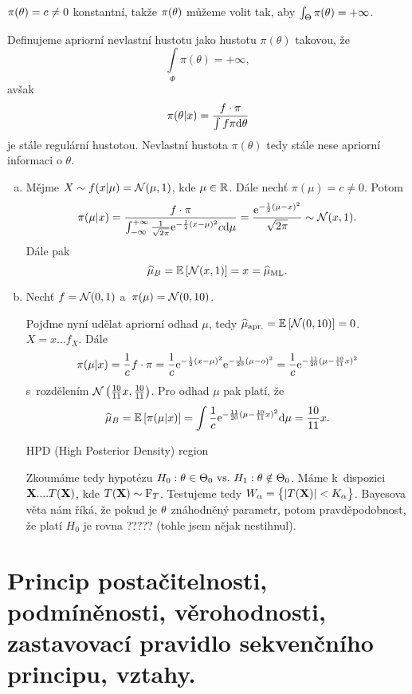 

$\pi(\theta)=c\neq0$ konstantní, takže $\pi(\theta)$ můžeme volit tak, aby $\int_\Theta\pi(\theta)=+\infty$.
\begin{define} Definujeme apriorní nevlastní hustotu jako hustotu $\pi(\theta)$ takovou, že $$ \int\limits_{\Phi}{\pi(\theta)} = +\infty,$$  avšak 
	$$\pi(\theta|x)=\frac{f\cdot \pi}{\int f\pi\mathrm{d}\theta}$$ je stále regulární hustotou. Nevlastní hustota $\pi(\theta)$ tedy stále nese apriorní informaci o $\theta$.
\end{define}
\begin{example}\begin{enumerate}[a)]
		\item 
	Mějme $X\sim f(x|\mu)=\mathcal{N}(\mu,1)$, kde $\mu\in\mathbb{R}$. Dále nechť $\pi(\mu)=c\neq0$. Potom$$ \pi(\mu|x)=\frac{f\cdot \pi}{\int_{-\infty}^{+\infty}\frac{1}{\sqrt{2\pi}}\mathrm{e}^{-\frac{1}{2}(x-\mu)^2}c\mathrm{d}\mu}=\frac{\mathrm{e}^{-\frac{1}{2}(\mu-x)^2}}{\sqrt{2\pi}}\sim\mathcal{N}(x,1).$$
	Dále pak 
	$$\widehat{\mu}_B=\mathbb{E}\left[ \mathcal{N}(x,1) \right]=x=\widehat{\mu}_{\mathrm{ML}}.$$
	\item Nechť $f=\mathcal{N}(0,1)$ a~$\pi(\mu)=\mathcal{N}(0,10)$.
	
	
	
	Pojďme nyní udělat apriorní odhad $\mu$, tedy $\widehat{\mu}_{\mathrm{apr.}}=\mathbb{E}\left[ \mathcal{N}(0,10) \right]=0$. $X=x...f_X$. Dále
	$$ \pi(\mu|x)=\frac{1}{c}f\cdot\pi=\frac{1}{c}\mathrm{e}^{-\frac{1}{2}(x-\mu)^2}\mathrm{e}^{-\frac{1}{20}(\mu-o)^2}=\frac{1}{c}\mathrm{e}^{-\frac{11}{20}(\mu-\frac{10}{11}x)^2}$$ s~rozdělením $\mathcal{N}\left(\frac{10}{11}x,\frac{10}{11}\right)$.
	Pro odhad $\mu$ pak platí, že
	$$\widehat{\mu}_B=\mathbb{E}\left[ \pi(\mu|x) \right]=\int\frac{1}{c}\mathrm{e}^{-\frac{11}{20}(\mu-\frac{10}{11}x)^2}\mathrm{d}\mu=\frac{10}{11}x.$$ 
	
	HPD (High Posterior Density) region
	
	
	
	Zkoumáme tedy hypotézu $H_0: \theta\in\Theta_0 ~\text{vs.}~ H_1: \theta\notin\Theta_0$. Máme k~dispozici $\textbf{X}....T(\textbf{X})$, kde $T(\textbf{X})\sim\mathrm{F}_T$. Testujeme tedy $W_\alpha=\big\{ |T(\textbf{X})|<K_\alpha \big\}$. Bayesova věta nám říká, že pokud je $\theta$ znáhodněný parametr, potom pravděpodobnost, že platí $H_0$ je rovna ????? (tohle jsem nějak nestihnul).
	\end{enumerate}
\end{example}
\chapter{Princip postačitelnosti, podmíněnosti, věrohodnosti, zastavovací pravidlo sekvenčního principu, vztahy.}


